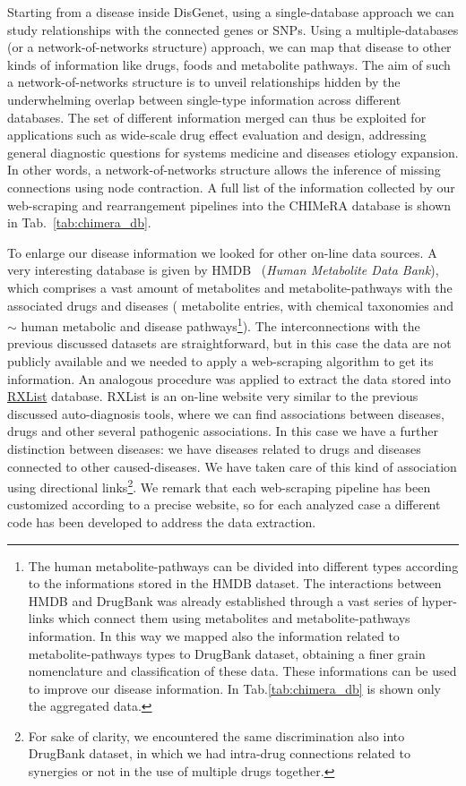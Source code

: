 \documentclass{standalone}
\begin{document}
Starting from a disease inside DisGenet, using a single-database approach we can study  relationships with the connected genes or SNPs.
Using a multiple-databases (or a network-of-networks structure) approach, we can map that disease to other kinds of information like drugs, foods and metabolite pathways.
The aim of such a network-of-networks structure is to unveil relationships hidden by the underwhelming overlap between single-type information across different databases.
The set of different information merged can thus be exploited for applications such as wide-scale drug effect evaluation and design, addressing general diagnostic questions for systems medicine and diseases etiology expansion.
In other words, a network-of-networks structure allows the inference of missing connections using node contraction.
A full list of the information collected by our \textsf{web-scraping} and rearrangement pipelines into the \textsf{CHIMeRA} database is shown in Tab.~\ref{tab:chimera_db}.

To enlarge our disease information we looked for other on-line data sources.
A very interesting database is given by HMDB~\cite{HMDB} (\emph{Human Metabolite Data Bank}), which comprises a vast amount of metabolites and metabolite-pathways with the associated drugs and diseases ( metabolite entries, with chemical taxonomies and $\sim$ human metabolic and disease pathways\footnote{
  The human metabolite-pathways can be divided into different types according to the informations stored in the HMDB dataset.
  The interactions between HMDB and DrugBank was already established through a vast series of hyper-links which connect them using metabolites and metabolite-pathways information.
  In this way we mapped also the information related to metabolite-pathways types to DrugBank dataset, obtaining a finer grain nomenclature and classification of these data.
  These informations can be used to improve our disease information.
  In Tab.\ref{tab:chimera_db} is shown only the aggregated data.
}).
The interconnections with the previous discussed datasets are straightforward, but in this case the data are not publicly available and we needed to apply a \textsf{web-scraping} algorithm to get its information.
An analogous procedure was applied to extract the data stored into \href{https://www.rxlist.com/script/main/hp.asp}{RXList} database.
RXList is an on-line website very similar to the previous discussed auto-diagnosis tools, where we can find associations between diseases, drugs and other several pathogenic associations.
In this case we have a further distinction between diseases: we have diseases related to drugs and diseases connected to other caused-diseases.
We have taken care of this kind of association using directional links\footnote{
  For sake of clarity, we encountered the same discrimination also into DrugBank dataset, in which we had intra-drug connections related to synergies or not in the use of multiple drugs together.
}.
We remark that each \textsf{web-scraping} pipeline has been customized according to a precise website, so for each analyzed case a different code has been developed to address the data extraction.
\end{document}
